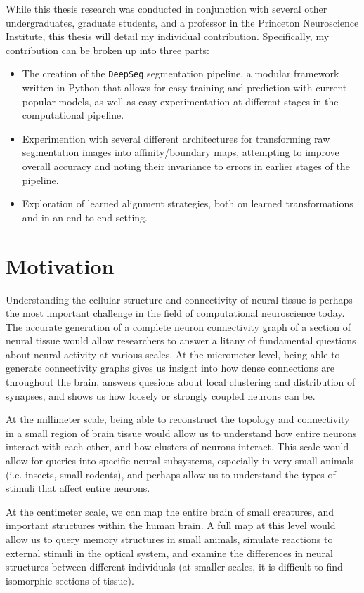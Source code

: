 While this thesis research was conducted in conjunction with several other undergraduates, graduate students, and a professor in the Princeton Neuroscience Institute, this thesis will detail my individual contribution. Specifically, my contribution can be broken up into three parts:
\begin{itemize}
\item The creation of the \texttt{DeepSeg} segmentation pipeline, a modular framework written in Python that allows for easy training and prediction with current popular models, as well as easy experimentation at different stages in the computational pipeline.
\item Experimention with several different architectures for transforming raw segmentation images into affinity/boundary maps, attempting to improve overall accuracy and noting their invariance to errors in earlier stages of the pipeline.
\item Exploration of learned alignment strategies, both on learned transformations and in an end-to-end setting.
\end{itemize}


\section{Motivation}

Understanding the cellular structure and connectivity of neural tissue is perhaps the most important challenge in the field of computational neuroscience today. The accurate generation of a complete neuron connectivity graph of a section of neural tissue would allow researchers to answer a litany of fundamental questions about neural activity at various scales. At the micrometer level, being able to generate connectivity graphs gives us insight into how dense connections are throughout the brain, answers quesions about local clustering and distribution of synapses, and shows us how loosely or strongly coupled neurons can be. 

At the millimeter scale, being able to reconstruct the topology and connectivity in a small region of brain tissue would allow us to understand how entire neurons interact with each other, and how clusters of neurons interact. This scale would allow for queries into specific neural subsystems, especially in very small animals (i.e. insects, small rodents), and perhaps allow us to understand the types of stimuli that affect entire neurons. 

At the centimeter scale, we can map the entire brain of small creatures, and important structures within the human brain. A full map at this level would allow us to query memory structures in small animals, simulate reactions to external stimuli in the optical system, and examine the differences in neural structures between different individuals (at smaller scales, it is difficult to find isomorphic sections of tissue). 


